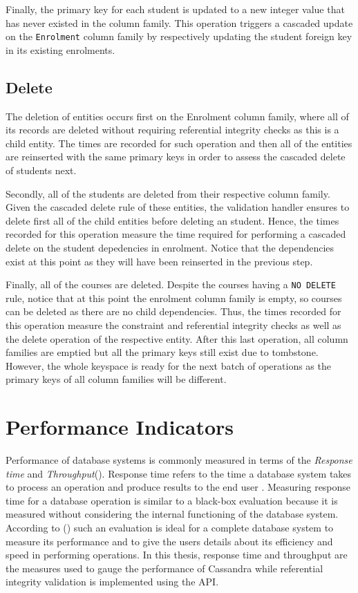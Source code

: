 Finally, the primary key for each student is updated to a new integer value that
has never existed in the column family. This operation triggers a cascaded
update on the \texttt{Enrolment} column family by respectively updating the
student foreign key in its existing enrolments.
		
\subsection{Delete} The deletion of entities occurs first on the Enrolment
column family, where all of its records are deleted without requiring referential
integrity checks as this is a child entity. The times are recorded for such
operation and then all of the entities are reinserted with the same primary keys
in order to assess the cascaded delete of students next.
				
Secondly, all of the students are deleted from their respective column family.
Given the cascaded delete rule of these entities, the validation handler ensures
to delete first all of the child entities before deleting an student. Hence, the
times recorded for this operation measure the time required for performing a
cascaded delete on the student depedencies in enrolment. Notice that the
dependencies exist at this point as they will have been reinserted in the
previous step.
				
Finally, all of the courses are deleted. Despite the courses having a \texttt{NO
DELETE} rule, notice that at this point the enrolment column family is empty, so
courses can be deleted as there are no child dependencies. Thus, the times
recorded for this operation measure the constraint and referential integrity
checks as well as the delete operation of the respective entity. After this last
operation, all column families are emptied but all the primary keys still exist
due to tombstone. However, the whole keyspace is ready for the next batch of
operations as the primary keys of all column families will be different.
	
	



\section{Performance Indicators}
Performance of database systems is commonly measured in terms of the
\textit{Response time} and \textit{Throughput}().
Response time refers to the time  a database system takes to process an
operation and produce results to the end user . Measuring response time for a
database operation is similar to a black-box evaluation because it is measured 
without considering the internal functioning  of the database system. According
to () such an evaluation is ideal for a complete database
system to measure its performance and to give the users details about its 
efficiency and speed in performing operations. In this thesis, response time and
throughput are the measures used to gauge the performance of Cassandra
while referential integrity validation is implemented using the \ac{API}.

